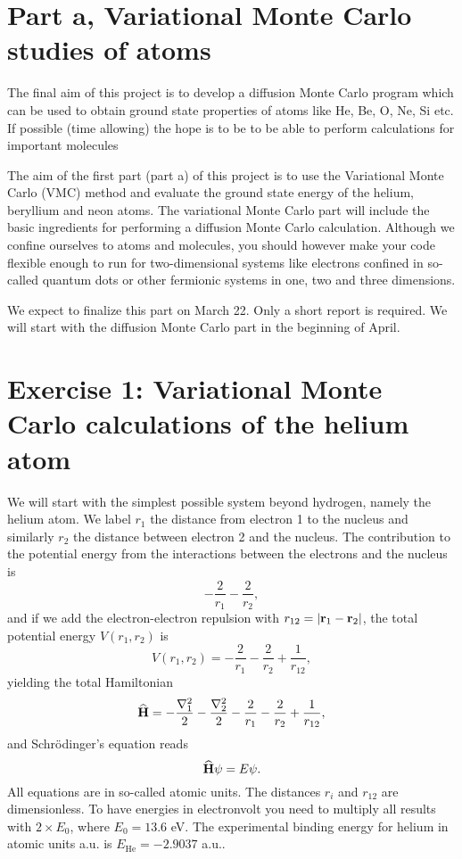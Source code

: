 \documentclass[10pt]{article}
\newcommand{\be}{\begin{equation}}
\newcommand{\ee}{\end{equation}}
\newcommand{\OP}[1]{{\bf\widehat{#1}}}
\begin{document}
\section*{Part a, Variational Monte Carlo studies of atoms}

The final aim of this project is to develop a diffusion Monte Carlo program which can be used to obtain ground state properties of atoms like He, Be, O, Ne, Si etc. If possible (time allowing) the hope is to be to be able to perform calculations
for important molecules 

The aim of the first part (part a) of this  project is to use the Variational Monte
Carlo (VMC) method and evaluate 
the ground state energy of  the
helium, beryllium and neon atoms. The variational Monte Carlo part will include the basic ingredients for performing a diffusion Monte Carlo calculation. Although we confine ourselves to atoms and molecules,  
you should however make your code flexible enough to run for two-dimensional systems like electrons confined in so-called quantum dots or other fermionic systems in one, two and three dimensions.

We expect to finalize this part on March 22. Only a short report is required. We will start with the diffusion Monte Carlo part in the beginning of April. 
\section*{Exercise 1: Variational Monte Carlo calculations of the helium atom}

We will start with the simplest possible system beyond hydrogen, namely the helium atom.
We label $r_1$ the distance from electron 1 to the nucleus and similarly 
$r_2$ the distance between electron 2 and the nucleus.
The contribution to the potential energy from the interactions between the 
electrons and the nucleus is
\be
   -\frac{2}{r_1}-\frac{2}{r_2},
\ee 
and if we add the electron-electron repulsion with
$r_{12}=|{\bf r}_1-{\bf r}_2|$, the total potential energy 
$V(r_1, r_2)$ is
\be
 V(r_1, r_2)=-\frac{2}{r_1}-\frac{2}{r_2}+
               \frac{1}{r_{12}},
\ee
yielding the total Hamiltonian
\be
   \OP{H}=-\frac{\nabla_1^2}{2}-\frac{\nabla_2^2}{2}
          -\frac{2}{r_1}-\frac{2}{r_2}+
               \frac{1}{r_{12}},
\ee
and Schr\"odinger's equation reads
\be
   \OP{H}\psi=E\psi.
\ee
All equations are in so-called atomic units. The distances
$r_i$ and $r_{12}$ are dimensionless. To have energies in electronvolt
you need to multiply all results with 
$2\times E_0$,
where $E_0=13.6$ eV.
The experimental binding energy for helium in atomic units a.u. is $E_{\mathrm{He}}=-2.9037$ a.u..
\end{document}
